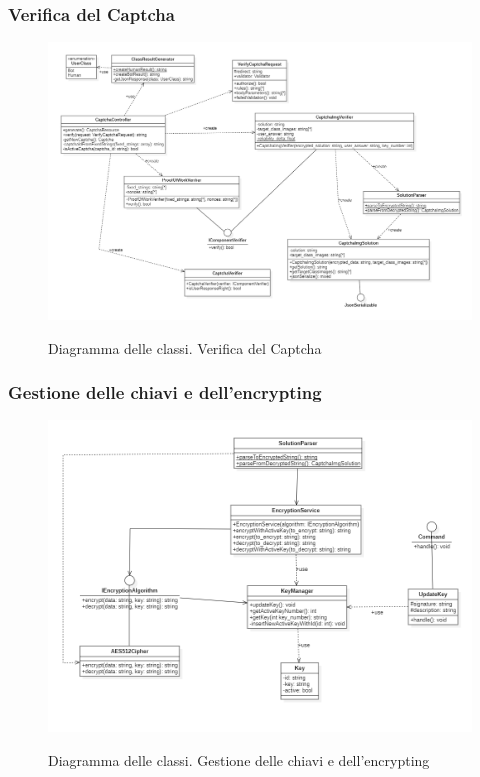 \subsubsection{Verifica del Captcha}

\begin{figure}[H]
	\centering
	\includegraphics[scale = 0.45]{img/verify.png}\\
	\caption{Diagramma delle classi. Verifica del Captcha}
\end{figure}
\newpage

\subsubsection{Gestione delle chiavi e dell'encrypting}

\begin{figure}[H]
	\centering
	\includegraphics[scale = 0.55]{img/key_manager.png}\\
	\caption{Diagramma delle classi. Gestione delle chiavi e dell'encrypting}
\end{figure}
\newpage

